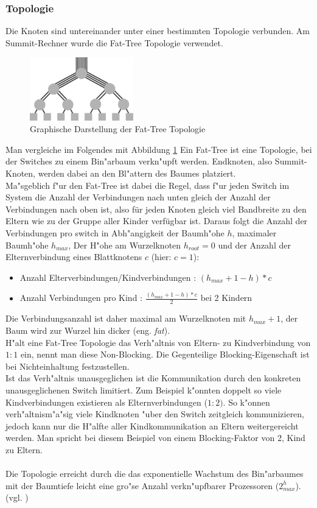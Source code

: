 \subsubsection{Topologie}
Die Knoten sind untereinander unter einer bestimmten Topologie verbunden. Am Summit-Rechner wurde die Fat-Tree Topologie verwendet.\\
\begin{figure}
\centering
\includegraphics[width=0.4\textwidth]{res/fat_tree.png}
\caption{\cite{fattree} Graphische Darstellung der Fat-Tree Topologie}
	\label{fig:fat_tree}
\end{figure}
Man vergleiche im Folgendes mit Abbildung \ref{fig:fat_tree}
Ein Fat-Tree ist eine Topologie, bei der Switches zu einem Bin"arbaum verkn"upft werden. Endknoten, also Summit-Knoten, werden dabei an den Bl"attern des Baumes platziert.\\
Ma"sgeblich f"ur den Fat-Tree ist dabei die Regel, dass f"ur jeden Switch im System die Anzahl der Verbindungen nach unten gleich der Anzahl der Verbindungen nach oben ist, also für jeden Knoten gleich viel Bandbreite zu den Eltern wie zu der Gruppe aller Kinder verfügbar ist. Daraus folgt die Anzahl der Verbindungen pro switch in Abh"angigkeit der Baumh"ohe $h$, maximaler Baumh"ohe $h_{max}$, Der H"ohe am Wurzelknoten $h_{root}=0$ und der Anzahl der Elternverbindung eines Blattknotens $c$ (hier: $c=1$):
\begin{itemize}
	\item Anzahl Elterverbindungen/Kindverbindungen : $(h_{max}+1-h)*c$
	\item Anzahl Verbindungen pro Kind : $\frac{(h_{max}+1-h)*c}{2}$ bei 2 Kindern
\end{itemize}
Die Verbindungsanzahl ist daher maximal am Wurzelknoten mit $h_{max}+1$, der Baum wird zur Wurzel hin \glqq dicker (eng. \textit{fat})\grqq.\\
H"alt eine Fat-Tree Topologie das Verh"altnis von Eltern- zu Kindverbindung von $1:1$ ein, nennt man diese Non-Blocking. Die Gegenteilige Blocking-Eigenschaft ist bei Nichteinhaltung festzustellen.\\
Ist das Verh"altnis unausgeglichen ist die Kommunikation durch den konkreten unausgeglichenen Switch limitiert. Zum Beispiel k"onnten doppelt so viele Kindverbindungen existieren als Elternverbindungen ($1:2)$. So k"onnen verh"altnism"a"sig viele Kindknoten "uber den Switch zeitgleich kommunizieren, jedoch kann nur die H"alfte aller Kindkommunikation an Eltern weitergereicht werden. Man spricht bei diesem Beispiel von einem Blocking-Faktor von 2, Kind zu Eltern.\\
\\
Die Topologie erreicht durch die das exponentielle Wachstum des Bin"arbaumes mit der Baumtiefe leicht eine gro"se Anzahl verkn"upfbarer Prozessoren ($2^h_{max}$). (vgl. \cite{fattree})\\
\\


